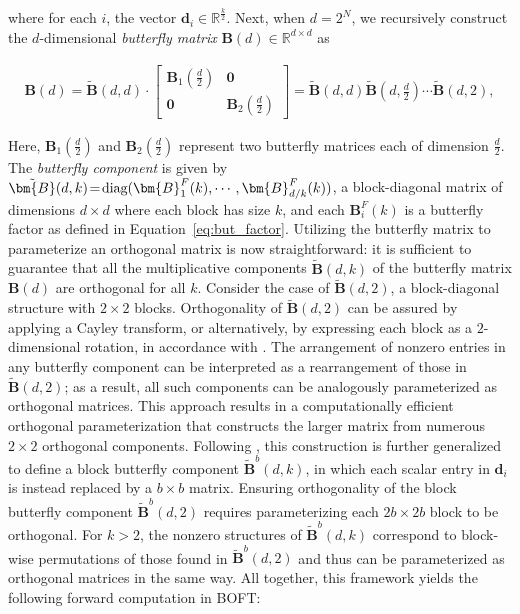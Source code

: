 where for each $i$, the vector $\bm{d}_i\in\mathbb{R}^{\frac{k}{2}}$. Next, when $d=2^N$, we recursively construct the $d$-dimensional \emph{butterfly matrix} $\bm{B}(d)\in\mathbb{R}^{d\times d}$ as

\begin{equation}
\begin{aligned}
    \!\!\bm{B}(d)=\tilde{\bm{B}}(d,d)\!\cdot\!\begin{bmatrix}
    \bm{B}_1(\frac{d}{2})\!\!\!\!\! & \bm{0} \\
    \bm{0}\!\!\!\!\! &\bm{B}_2(\frac{d}{2})
    \end{bmatrix}= \tilde{\bm{B}}(d,d)\tilde{\bm{B}}(d,\frac{d}{2})\cdots\tilde{\bm{B}}(d,2),
\end{aligned}
\end{equation}

Here, $\bm{B}_1(\frac{d}{2})$ and $\bm{B}_2(\frac{d}{2})$ represent two butterfly matrices each of dimension $\frac{d}{2}$. The \emph{butterfly component} is given by $\thickmuskip=2mu \medmuskip=2mu \tilde{\bm{B}}(d,k)=\text{diag}(\bm{B}^F_1(k),\cdots,\bm{B}^F_{d/k}(k))$, a block-diagonal matrix of dimensions $d\times d$ where each block has size $k$, and each $\bm{B}^F_i(k)$ is a butterfly factor as defined in Equation~\ref{eq:but_factor}. Utilizing the butterfly matrix to parameterize an orthogonal matrix is now straightforward: it is sufficient to guarantee that all the multiplicative components $\tilde{\bm{B}}(d,k)$ of the butterfly matrix $\bm{B}(d)$ are orthogonal for all $k$. Consider the case of $\tilde{\bm{B}}(d,2)$, a block-diagonal structure with $2\times 2$ blocks. Orthogonality of $\tilde{\bm{B}}(d,2)$ can be assured by applying a Cayley transform, or alternatively, by expressing each block as a $2$-dimensional rotation, in accordance with \cite{liu2021orthogonal,qiu2023controlling}. The arrangement of nonzero entries in any butterfly component can be interpreted as a rearrangement of those in $\tilde{\bm{B}}(d,2)$; as a result, all such components can be analogously parameterized as orthogonal matrices. This approach results in a computationally efficient orthogonal parameterization that constructs the larger matrix from numerous $2\times 2$ orthogonal components. Following \cite{chen2022pixelated}, this construction is further generalized to define a block butterfly component $\tilde{\bm{B}}^b(d,k)$, in which each scalar entry in $\bm{d}_i$ is instead replaced by a $b\times b$ matrix. Ensuring orthogonality of the block butterfly component $\tilde{\bm{B}}^b(d,2)$ requires parameterizing each $2b\times 2b$ block to be orthogonal. For $k>2$, the nonzero structures of $\tilde{\bm{B}}^b(d,k)$ correspond to block-wise permutations of those found in $\tilde{\bm{B}}^b(d,2)$ and thus can be parameterized as orthogonal matrices in the same way. All together, this framework yields the following forward computation in BOFT:

